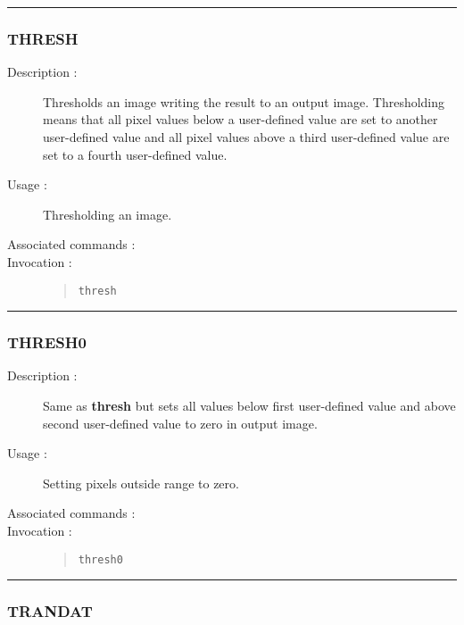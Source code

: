 \hrule 
\subsubsection*{\label{THRESH}THRESH}

\begin{description}

\item[Description :] Thresholds an image writing the result to an
output image.  Thresholding means that all pixel values below a
user-defined value are set to another user-defined value and all pixel
values above a third user-defined value are set to a fourth
user-defined value.

\item[Usage :] Thresholding an image.
\item[Associated commands :] {\tt {}}
\item[Invocation :]

\begin{quote}{\tt  thresh }\end{quote}

\end{description}

\hrule 
\subsubsection*{\label{THRESH0}THRESH0}

\begin{description}

\item[Description :] Same as {\bf thresh} but sets all values below first
user-defined value and above second user-defined value to zero in
output image.

\item[Usage :] Setting pixels outside range to zero.
\item[Associated commands :] {\tt {}}
\item[Invocation :]

\begin{quote}{\tt  thresh0 }\end{quote}

\end{description}

\hrule 
\subsubsection*{\label{TRANDAT}TRANDAT}

